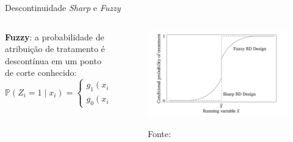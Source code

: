 \documentclass[aspectratio=1610, 10pt]{beamer}
\begin{document}
\begin{frame}{Descontinuidade \emph{Sharp} e \emph{Fuzzy}}
\begin{columns}[T]
\begin{column}{0.48\linewidth}
            \vspace{0.5cm}
            \textbf{Fuzzy}: a probabilidade de atribuição de tratamento é descontínua em um ponto de corte conhecido:
            \begin{equation*}
                \mathbb{P}(Z_i=1 \mid x_i) = \begin{cases}
                    g_1(x_i) & \text{se } x_i \geq c \\
                    g_0(x_i) & \text{c.c.}
                \end{cases}
            \end{equation*}
		\end{column}
		\begin{column}{0.48\linewidth}
            \vspace{0.5cm}%
            \begin{figure}
                \centering
			    \includegraphics[width=\linewidth]{fig/SharpVsFuzzy.png}

                \tiny{Fonte: \cite{cunningham2021causal}}
            \end{figure}
        \end{column}
	\end{columns}
\end{frame}
\end{document}
